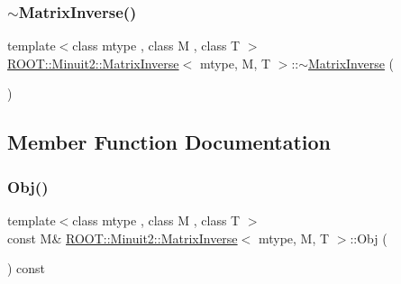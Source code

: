 \subsubsection{\texorpdfstring{$\sim$MatrixInverse()}{~MatrixInverse()}\hspace{0.1cm}{\footnotesize\ttfamily [3/3]}}
{\footnotesize\ttfamily template$<$class mtype , class M , class T $>$ \\
\mbox{\hyperlink{classROOT_1_1Minuit2_1_1MatrixInverse}{R\+O\+O\+T\+::\+Minuit2\+::\+Matrix\+Inverse}}$<$ mtype, M, T $>$\+::$\sim$\mbox{\hyperlink{classROOT_1_1Minuit2_1_1MatrixInverse}{Matrix\+Inverse}} (\begin{DoxyParamCaption}{ }\end{DoxyParamCaption})\hspace{0.3cm}{\ttfamily [inline]}}



\subsection{Member Function Documentation}
\mbox{\label{classROOT_1_1Minuit2_1_1MatrixInverse_a189a8ae3c36a989a47758de7aee4e181}} 
\subsubsection{\texorpdfstring{Obj()}{Obj()}\hspace{0.1cm}{\footnotesize\ttfamily [1/3]}}
{\footnotesize\ttfamily template$<$class mtype , class M , class T $>$ \\
const M\& \mbox{\hyperlink{classROOT_1_1Minuit2_1_1MatrixInverse}{R\+O\+O\+T\+::\+Minuit2\+::\+Matrix\+Inverse}}$<$ mtype, M, T $>$\+::Obj (\begin{DoxyParamCaption}{ }\end{DoxyParamCaption}) const\hspace{0.3cm}{\ttfamily [inline]}}

\mbox{\label{classROOT_1_1Minuit2_1_1MatrixInverse_a189a8ae3c36a989a47758de7aee4e181}} 
